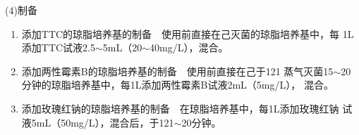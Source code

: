 \documentclass[11pt,a4paper]{article}
\newenvironment{SC}{%
  \CJKfamily{gbsn}%
  \CJKtilde
  \CJKnospace}{}
\begin{document}
\begin{CJK}{UTF8}{}
\begin{SC}
(4)制备
\begin{enumerate}
\item 添加TTC的琼脂培养基的制备~~使用前直接在己灭菌的琼脂培养基中，每
1L添加TTC试液2.5$\sim$5mL（20$\sim$40mg/L），混合。
\item 添加两性霉素B的琼脂培养基的制备~~使用前直接在己于121
蒸气灭菌15$\sim$20分钟的琼脂培养基中，每1L添加两性霉素B试液2mL（5mg/L），
混合。
\item 添加玫瑰红钠的琼脂培养基的制备~~在琼脂培养基中，每1L添加玫瑰红钠
试液5mL（50mg/L），混合后，于121$\sim$20分钟。
\end{enumerate}

\newpage
\end{SC}
\end{CJK}
\end{document}
